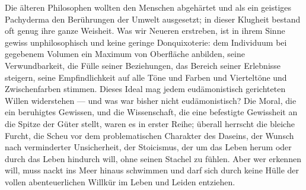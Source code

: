 Die älteren Philosophen wollten den Menschen abgehärtet und als ein geistiges Pachyderma den Berührungen der Umwelt ausgesetzt; in dieser Klugheit bestand oft genug ihre ganze Weisheit. Was wir Neueren erstreben, ist in ihrem Sinne gewiss unphilosophisch und keine geringe Donquixoterie: dem Individuum bei gegebenem Volumen ein Maximum von Oberfläche anbilden, seine Verwundbarkeit, die Fülle seiner Beziehungen, das Bereich seiner Erlebnisse steigern, seine Empfindlichkeit auf alle Töne und Farben und Vierteltöne und Zwischenfarben stimmen. Dieses Ideal mag jedem eudämonistisch gerichteten Willen widerstehen — und was war bisher nicht eudämonistisch? Die Moral, die ein beruhigtes Gewissen, und die Wissenschaft, die eine befestigte Gewissheit an die Spitze der Güter stellt, waren es in erster Reihe; überall herrscht die bleiche Furcht, die Scheu vor dem problematischen Charakter des Daseins, der Wunsch nach verminderter Unsicherheit, der Stoicismus, der um das Leben herum oder durch das Leben hindurch will, ohne seinen Stachel zu fühlen. Aber wer erkennen will, muss nackt ins Meer hinaus schwimmen und darf sich durch keine Hülle der vollen abenteuerlichen Willkür im Leben und Leiden entziehen.
\par

